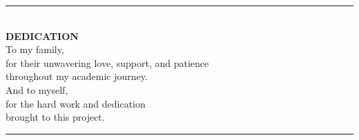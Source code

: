 \newpage
\vspace*{\fill}
\begin{center}

\rule{4cm}{0.4pt}\\[1.5cm]

{\Large \textbf{DEDICATION}}\\[1.5cm]

{\large To my family,\\[0.3cm]
for their unwavering love, support, and patience\\[0.3cm]
throughout my academic journey.}\\[1cm]

{\large And to myself,\\[0.3cm]
for the hard work and dedication\\[0.3cm]
brought to this project.}\\[1.5cm]

\rule{4cm}{0.4pt}

\end{center}
\vspace*{\fill}